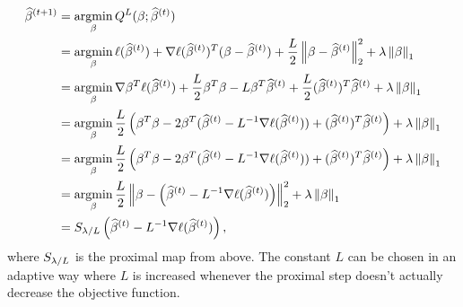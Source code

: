 \begin{align*}
    \widehat{\beta}^{(t+1)} &= \operatorname*{argmin}_\beta Q^L(\beta;\widehat{\beta}^{(t)})\\
    &=\operatorname*{argmin}_\beta \ell(\widehat{\beta}^{(t)}) +\nabla \ell(\widehat{\beta}^{(t)})^T(\beta - \widehat{\beta}^{(t)}) + \frac{L}{2}\left\|\beta - \widehat{\beta}^{(t)}\right\|_2^2 + \lambda \left\|\beta\right\|_1\\
    &=\operatorname*{argmin}_\beta  \nabla \beta^T\ell(\widehat{\beta}^{(t)}) + \frac{L}{2}\beta^T\beta -L\beta^T\widehat{\beta}^{(t)}+\frac{L}{2}(\widehat{\beta}^{(t)})^T\widehat{\beta}^{(t)}  + \lambda \left\|\beta\right\|_1\\
    &=\operatorname*{argmin}_\beta \frac{L}{2}\left(\beta^T\beta  - 2\beta^T(\widehat{\beta}^{(t)} - L^{-1}\nabla \ell(\widehat{\beta}^{(t)}))+ (\widehat{\beta}^{(t)})^T\widehat{\beta}^{(t)}\right) +\lambda \left\|\beta\right\|_1\\
    &=\operatorname*{argmin}_\beta \frac{L}{2}\left(\beta^T\beta  - 2\beta^T(\widehat{\beta}^{(t)} - L^{-1}\nabla \ell(\widehat{\beta}^{(t)}))+ (\widehat{\beta}^{(t)})^T\widehat{\beta}^{(t)}\right) +\lambda \left\|\beta\right\|_1\\
    &=\operatorname*{argmin}_\beta \frac{L}{2}\left\|\beta - \left(\widehat{\beta}^{(t)} - L^{-1}\nabla \ell(\widehat{\beta}^{(t)})\right)\right\|_2^2 +\lambda\left\|\beta\right\|_1\\
    &=S_{\lambda/L}\left(\widehat{\beta}^{(t)} - L^{-1}\nabla \ell(\widehat{\beta}^{(t)})\right),
\end{align*}
where $S_{\lambda/L}$ is the proximal map from above. The constant $L$ can be chosen in an adaptive way where $L$ is increased whenever the proximal step doesn't actually decrease the objective function.
